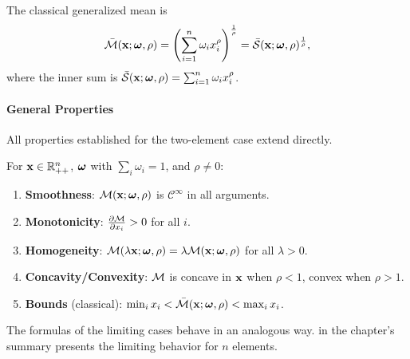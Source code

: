 \begin{definition}
\label{def:general-classical}
The classical generalized mean is
\begin{equation}
\label{eq:general-classical}
\bar{\mathcal{M}}(\mathbf{x}; \boldsymbol{\omega}, \rho) = \left( \sum_{i=1}^n \omega_i x_i^\rho \right)^{\frac{1}{\rho}} = \bar{\mathcal{S}}(\mathbf{x}; \boldsymbol{\omega}, \rho)^{\frac{1}{\rho}},
\end{equation}
where the inner sum is $\bar{\mathcal{S}}(\mathbf{x}; \boldsymbol{\omega}, \rho) = \sum_{i=1}^n \omega_i x_i^\rho$.
\end{definition}

\paragraph{General Properties}

All properties established for the two-element case extend directly.

\begin{proposition}
\label{prop:general-properties}
For $\mathbf{x} \in \mathbb{R}_{++}^n$, $\boldsymbol{\omega}$ with $\sum_i \omega_i = 1$, and $\rho \neq 0$:
\begin{enumerate}[leftmargin=2em]
    \item \textbf{Smoothness}: $\mathcal{M}(\mathbf{x}; \boldsymbol{\omega}, \rho)$ is $\mathcal{C}^\infty$ in all arguments.
    \item \textbf{Monotonicity}: $\frac{\partial \mathcal{M}}{\partial x_i} > 0$ for all $i$.
    \item \textbf{Homogeneity}: $\mathcal{M}(\lambda \mathbf{x}; \boldsymbol{\omega}, \rho) = \lambda \mathcal{M}(\mathbf{x}; \boldsymbol{\omega}, \rho)$ for all $\lambda > 0$.
    \item \textbf{Concavity/Convexity}: $\mathcal{M}$ is concave in $\mathbf{x}$ when $\rho < 1$, convex when $\rho > 1$.
    \item \textbf{Bounds} (classical): $\min_i x_i < \bar{\mathcal{M}}(\mathbf{x}; \boldsymbol{\omega}, \rho) < \max_i x_i$.
\end{enumerate}
\end{proposition}
The formulas of the limiting cases behave in an analogous way.  in the chapter's summary presents the limiting behavior for $n$ elements.

